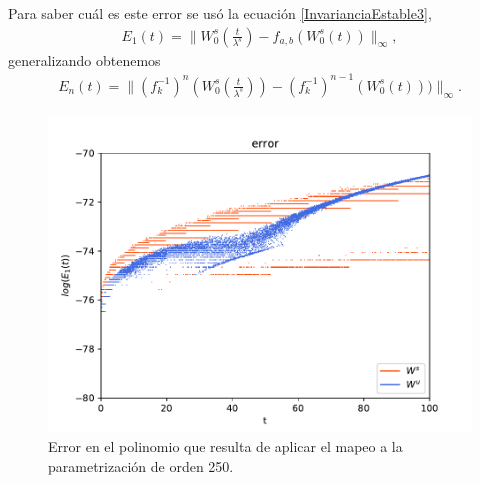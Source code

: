 \documentclass[11pt]{beamer}
\theoremstyle{definition}
\begin{document}
\begin{frame}
Para saber cuál es este error se usó la ecuación \eqref{InvarianciaEstable3},
\begin{eqnarray}
E_{1}(t)=\bigg\| W_{0}^{s}\left(\frac{t}{\lambda^{s}}\right)-f_{a,b}(W_{0}^{s}(t))\bigg\|_{\infty},
\label{error-1aplicacion}
\end{eqnarray}
generalizando obtenemos
\begin{eqnarray}
E_{n}(t)=\bigg\| (f^{-1}_{k})^{n}\left(W_{0}^{s}\left(\frac{t}{\lambda^{s}}\right)\right)- (f^{-1}_{k})^{n-1}(W_{0}^{s}(t)))\bigg\|_{\infty}.
\label{error-n-aplicacion}
\end{eqnarray}
\end{frame}
\begin{frame}
\begin{figure}[h!]
	\centering
	\includegraphics[scale=0.6]{error1ite.pdf}
	\caption{Error en el polinomio que resulta de aplicar el mapeo a la parametrización de orden 250.}
	\label{error-1iteracion}
\end{figure}
\end{frame}
\end{document}
